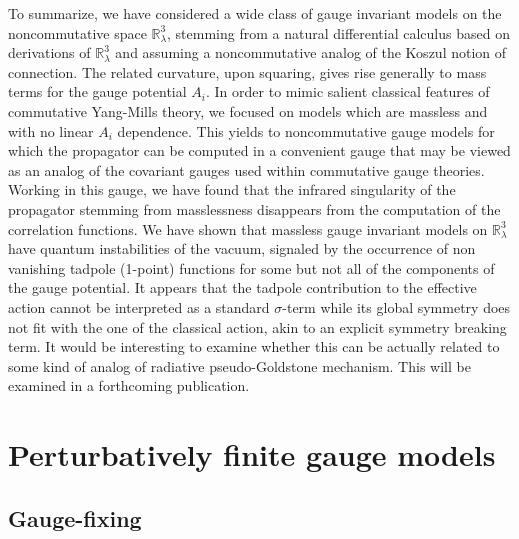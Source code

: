 \documentclass[11pt]{book}
\theoremstyle{break}
\begin{document}
To summarize, we have considered a wide class of gauge invariant models on the noncommutative space $\mathbb{R}^3_\lambda$, stemming from a natural differential calculus based on derivations of $\mathbb{R}^3_\lambda$ and assuming a noncommutative analog of the Koszul notion of connection. The related curvature, upon squaring, gives rise generally to mass terms for the gauge potential $A_i$. In order to mimic salient classical features of commutative Yang-Mills theory, we focused on models which are massless and with no linear $A_i$ dependence. This yields to noncommutative gauge models for which the propagator can be computed in a convenient gauge that may be viewed as an analog of the covariant gauges used within commutative gauge theories. Working in this gauge, we have found that the infrared singularity of the propagator stemming from masslessness disappears from the computation of the correlation functions. We have shown that massless gauge invariant models on $\mathbb{R}^3_\lambda$ have quantum instabilities of the vacuum, signaled by the occurrence of non vanishing tadpole (1-point) functions for some but not all of the components of the gauge potential. It appears that the tadpole contribution to the effective action cannot be interpreted as a standard $\sigma$-term while its global symmetry does not fit with the one of the classical action, akin to an explicit symmetry breaking term. It would be interesting to examine whether this can be actually related to some kind of analog of radiative pseudo-Goldstone mechanism. This will be examined in a forthcoming publication.\par 









\section*{Perturbatively finite gauge models}


\subsection*{Gauge-fixing}\label{subsection31}
\end{document}
